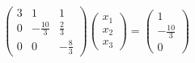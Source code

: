 \documentclass[preview]{standalone}
\begin{document}
\begin{align*}
\begin{pmatrix}3 & 1 & 1 \\0 & -\frac{10}{3} & \frac{2}{3} \\0 & 0 & -\frac{8}{3}\end{pmatrix}\begin{pmatrix} x_1 \\ x_2 \\ x_3 \end{pmatrix}= \begin{pmatrix} 1 \\ -\frac{10}{3} \\ 0 \end{pmatrix}
\end{align*}
\end{document}
